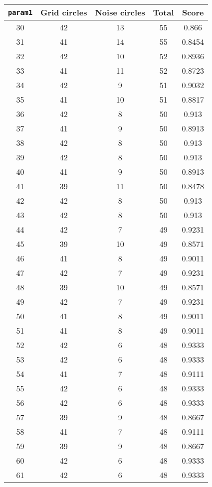 \documentclass[letterpaper, 12pt]{article}
\begin{document}
\begin{longtable}{|c|c|c|c|c|}
\hline
\textbf{\texttt{param1}} & \textbf{Grid circles} & \textbf{Noise circles} & \textbf{Total} & \textbf{Score} \\
\hline
30 & 42 & 13 & 55 & 0.866 \\
\hline
31 & 41 & 14 & 55 & 0.8454 \\
\hline
32 & 42 & 10 & 52 & 0.8936 \\
\hline
33 & 41 & 11 & 52 & 0.8723 \\
\hline
34 & 42 & 9 & 51 & 0.9032 \\
\hline
35 & 41 & 10 & 51 & 0.8817 \\
\hline
36 & 42 & 8 & 50 & 0.913 \\
\hline
37 & 41 & 9 & 50 & 0.8913 \\
\hline
38 & 42 & 8 & 50 & 0.913 \\
\hline
39 & 42 & 8 & 50 & 0.913 \\
\hline
40 & 41 & 9 & 50 & 0.8913 \\
\hline
41 & 39 & 11 & 50 & 0.8478 \\
\hline
42 & 42 & 8 & 50 & 0.913 \\
\hline
43 & 42 & 8 & 50 & 0.913 \\
\hline
44 & 42 & 7 & 49 & 0.9231 \\
\hline
45 & 39 & 10 & 49 & 0.8571 \\
\hline
46 & 41 & 8 & 49 & 0.9011 \\
\hline
47 & 42 & 7 & 49 & 0.9231 \\
\hline
48 & 39 & 10 & 49 & 0.8571 \\
\hline
49 & 42 & 7 & 49 & 0.9231 \\
\hline
50 & 41 & 8 & 49 & 0.9011 \\
\hline
51 & 41 & 8 & 49 & 0.9011 \\
\hline
52 & 42 & 6 & 48 & 0.9333 \\
\hline
53 & 42 & 6 & 48 & 0.9333 \\
\hline
54 & 41 & 7 & 48 & 0.9111 \\
\hline
55 & 42 & 6 & 48 & 0.9333 \\
\hline
56 & 42 & 6 & 48 & 0.9333 \\
\hline
57 & 39 & 9 & 48 & 0.8667 \\
\hline
58 & 41 & 7 & 48 & 0.9111 \\
\hline
59 & 39 & 9 & 48 & 0.8667 \\
\hline
60 & 42 & 6 & 48 & 0.9333 \\
\hline
61 & 42 & 6 & 48 & 0.9333 \\

\end{longtable}
\end{document}
